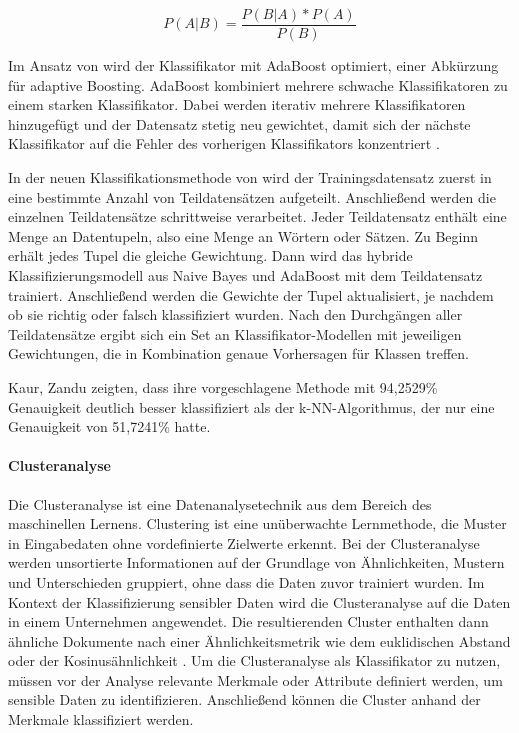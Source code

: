 \begin{equation}
    \label{e:naive-bayes}
    P(A|B) = \frac{P(B|A) * P(A)}{P(B)}
\end{equation}

Im Ansatz von \cite{Kaur.2016} wird der Klassifikator mit AdaBoost optimiert, einer Abkürzung für adaptive Boosting. AdaBoost kombiniert mehrere schwache Klassifikatoren zu einem starken Klassifikator. Dabei werden iterativ mehrere Klassifikatoren hinzugefügt und der Datensatz stetig neu gewichtet, damit sich der nächste Klassifikator auf die Fehler des vorherigen Klassifikators konzentriert \cite{Frochte.2018c}.

In der neuen Klassifikationsmethode von \cite{Kaur.2016} wird der Trainingsdatensatz zuerst in eine bestimmte Anzahl von Teildatensätzen aufgeteilt. Anschließend werden die einzelnen Teildatensätze schrittweise verarbeitet. Jeder Teildatensatz enthält eine Menge an Datentupeln, also eine Menge an Wörtern oder Sätzen. Zu Beginn erhält jedes Tupel die gleiche Gewichtung. Dann wird das hybride Klassifizierungsmodell aus Naive Bayes und AdaBoost mit dem Teildatensatz trainiert. Anschließend werden die Gewichte der Tupel aktualisiert, je nachdem ob sie richtig oder falsch klassifiziert wurden. Nach den Durchgängen aller Teildatensätze ergibt sich ein Set an Klassifikator-Modellen mit jeweiligen Gewichtungen, die in Kombination genaue Vorhersagen für Klassen treffen.

Kaur, Zandu \cite{Kaur.2016} zeigten, dass ihre vorgeschlagene Methode mit 94,2529\% Genauigkeit deutlich besser klassifiziert als der k-NN-Algorithmus, der nur eine Genauigkeit von 51,7241\% hatte.

\paragraph{Clusteranalyse}
Die Clusteranalyse ist eine Datenanalysetechnik aus dem Bereich des maschinellen Lernens. Clustering ist eine unüberwachte Lernmethode, die Muster in Eingabedaten ohne vordefinierte Zielwerte erkennt. Bei der Clusteranalyse werden unsortierte Informationen auf der Grundlage von Ähnlichkeiten, Mustern und Unterschieden gruppiert, ohne dass die Daten zuvor trainiert wurden. Im Kontext der Klassifizierung sensibler Daten wird die Clusteranalyse auf die Daten in einem Unternehmen angewendet. Die resultierenden Cluster enthalten dann ähnliche Dokumente nach einer Ähnlichkeitsmetrik wie dem euklidischen Abstand oder der Kosinusähnlichkeit \cite{Suyal.2014}.
Um die Clusteranalyse als Klassifikator zu nutzen, müssen vor der Analyse relevante Merkmale oder Attribute definiert werden, um sensible Daten zu identifizieren. Anschließend können die Cluster anhand der Merkmale klassifiziert werden.

